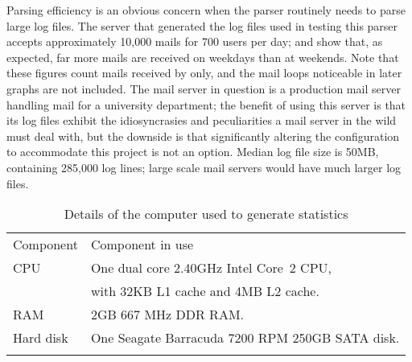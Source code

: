 Parsing efficiency is an obvious concern when the parser routinely needs to
parse large log files.  The server that generated the log files used in
testing this parser accepts approximately 10,000 mails for 700 users per
day;  and  show that, as expected, far more mails are
received on weekdays than at weekends.  Note that these figures count mails
received by  only, and the mail loops noticeable in later
graphs are not included.  The mail server in question is a production mail
server handling mail for a university department; the benefit of using this
server is that its log files exhibit the idiosyncrasies and peculiarities a
mail server in the wild must deal with, but the downside is that
significantly altering the configuration to accommodate this project is not
an option.  Median log file size is 50MB, containing 285,000 log lines;
large scale mail servers would have much larger log files.



\begin{table}[thbp]
    \caption{Details of the computer used to generate statistics}
    \empty{}\label{Details of the computer used to generate statistics}
    \centering{}
    \begin{tabular}[]{ll}
        \tabletopline{}%
        Component  & Component in use                                   \\
        \tablemiddleline{}%
        CPU         & One dual core 2.40GHz Intel\textregistered{}
                        Core\texttrademark{}~2 CPU,                     \\
                    & with 32KB L1 cache and 4MB L2 cache.              \\
        RAM         & 2GB 667 MHz DDR RAM\@.                            \\
        Hard disk   & One Seagate Barracuda 7200 RPM 250GB SATA disk.   \\
        \tablebottomline{}%
    \end{tabular}
\end{table}

